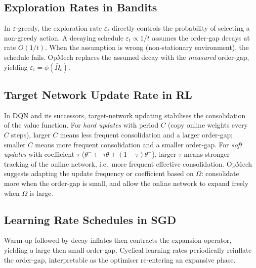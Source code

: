 \documentclass[12pt,a4paper]{article}
\newcommand{\Ogap}{\Omega}
\begin{document}
\subsection{Exploration Rates in Bandits}
\label{sec:hp_bandits}

In $\varepsilon$-greedy, the exploration rate $\varepsilon_t$ directly controls
the probability of selecting a non-greedy action. A decaying schedule
$\varepsilon_t \propto 1/t$ assumes the order-gap decays at rate $O(1/t)$.
When the assumption is wrong (non-stationary environment), the schedule fails.
OpMech replaces the assumed decay with the \emph{measured} order-gap,
yielding $\varepsilon_t = \phi(\bar\Ogap_t)$.

\subsection{Target Network Update Rate in RL}
\label{sec:hp_rl}

In DQN \citep{mnih2015dqn} and its successors, target-network updating
stabilises the consolidation of the value function. For \emph{hard
updates} with period $C$ (copy online weights every $C$ steps), larger $C$
means less frequent consolidation and a larger order-gap; smaller $C$ means
more frequent consolidation and a smaller order-gap. For \emph{soft updates}
with coefficient $\tau$ ($\theta^- \leftarrow \tau\theta + (1-\tau)\theta^-$),
larger $\tau$ means stronger tracking of the online network, i.e.\ more
frequent effective consolidation. OpMech suggests adapting the update
frequency or coefficient based on $\Ogap$: consolidate more when the
order-gap is small, and allow the online network to expand freely when
$\Ogap$ is large.

\subsection{Learning Rate Schedules in SGD}
\label{sec:hp_sgd}

Warm-up followed by decay inflates then contracts the expansion operator,
yielding a large then small order-gap. Cyclical learning rates
\citep{smith2017cyclical} periodically reinflate the order-gap, interpretable
as the optimiser re-entering an expansive phase.

\end{document}
